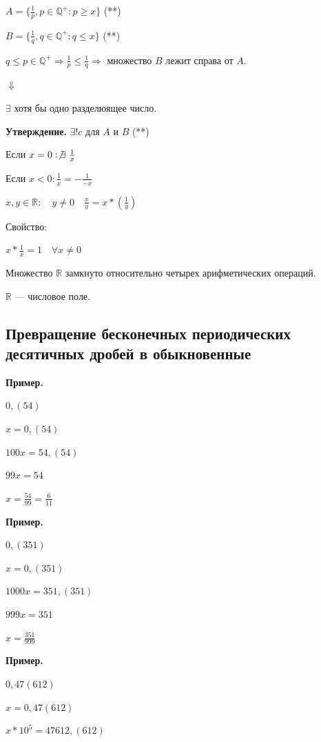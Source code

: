 \documentclass{article}
\begin{document}
        $A = \{\frac{1}{p}, p \in \mathbb{Q}^{+}: p \geq x\}$ (**)

        $B = \{\frac{1}{q}, q \in \mathbb{Q}^{+}: q \leq x\}$ (**)

        $q \leq p \in \mathbb{Q}^{+} \Rightarrow \frac{1}{p} \leq \frac{1}{q} \Rightarrow$ множество $B$ лежит справа от $A$.
        
        $\Downarrow$

        $\exists$ хотя бы одно разделюящее число.

        \textbf{Утверждение.} $\exists! c$ для $A$ и $B$ (**)

        Если $x = 0: \not\exists\ \frac{1}{x}$
        
        Если $x < 0: \frac{1}{x} = -\frac{1}{-x}$

        $x, y \in \mathbb{R}:\quad y \neq 0 \quad \frac{x}{y} = x*(\frac{1}{y})$

        Свойство:

        $x*\frac{1}{x} = 1 \quad \forall x \neq 0$

        Множество $\mathbb{R}$ замкнуто относительно четырех арифметических операций.

        $\mathbb{R}$ --- числовое поле.

        \subsection{Превращение бесконечных периодических десятичных дробей в обыкновенные}

        \textbf{Пример.}
        
        $0,(54)$

        $x = 0,(54)$

        $100x = 54,(54)$

        $99x = 54$

        $x = \frac{54}{99} = \frac{6}{11}$

        \textbf{Пример.}

        $0,(351)$

        $x = 0,(351)$

        $1000x = 351,(351)$

        $999x = 351$

        $x = \frac{351}{999}$

        \textbf{Пример.}

        $0,47(612)$

        $x = 0,47(612)$

        $x * 10^5 = 47612,(612)$
\end{document}

